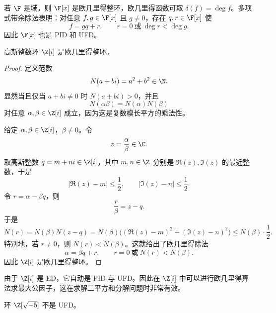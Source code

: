 \begin{example}
若 $\F$ 是域，则 $\F[x]$ 是欧几里得整环，欧几里得函数可取 $\delta(f)=\deg f$。多项式带余除法表明：对任意 $f,g\in\F[x]$ 且 $g\neq 0$，存在 $q,r\in\F[x]$ 使
\[
f=gq+r,
\qquad r=0\ \text{或}\ \deg r<\deg g.
\]
因此 $\F[x]$ 也是 PID 和 UFD。
\end{example}

\begin{theorem}
高斯整数环 $\Z[i]$ 是欧几里得整环。
\end{theorem}

\begin{proof}
定义范数
\[
N(a+bi)=a^2+b^2\in \N.
\]
显然当且仅当 $a+bi\neq 0$ 时 $N(a+bi)>0$，并且
\[
N(\alpha\beta)=N(\alpha)N(\beta)
\]
对任意 $\alpha,\beta\in\Z[i]$ 成立，因为这是复数模长平方的乘法性。

给定 $\alpha,\beta\in\Z[i]$，$\beta\neq 0$。令
\[
z=\frac{\alpha}{\beta}\in \C.
\]
取高斯整数 $q=m+ni\in\Z[i]$，其中 $m,n\in\Z$ 分别是 $\Re(z),\Im(z)$ 的最近整数，于是
\[
|\Re(z)-m|\le \frac12,
\qquad
|\Im(z)-n|\le \frac12.
\]
令 $r=\alpha-\beta q$，则
\[
\frac{r}{\beta}=z-q.
\]
于是
\[
N(r)=N(\beta)N(z-q)
= N(\beta)\bigl((\Re(z)-m)^2+(\Im(z)-n)^2\bigr)
\le N(\beta)\cdot \frac12.
\]
特别地，若 $r\neq 0$，则 $N(r)<N(\beta)$。这就给出了欧几里得除法
\[
\alpha=\beta q+r,
\qquad r=0\ \text{或}\ N(r)<N(\beta).
\]
因此 $\Z[i]$ 是欧几里得整环。
\end{proof}

\begin{remark}
由于 $\Z[i]$ 是 ED，它自动是 PID 与 UFD。因此在 $\Z[i]$ 中可以进行欧几里得算法求最大公因子，这在求解二平方和分解问题时非常有效。
\end{remark}

\begin{proposition}
环 $\Z[\sqrt{-5}]$ 不是 UFD。
\end{proposition}

